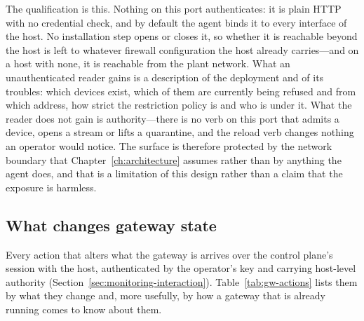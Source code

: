 \documentclass[12pt,a4paper]{report}
\begin{document}
The qualification is this. Nothing on this port authenticates: it is
plain HTTP with no credential check, and by default the agent binds it
to every interface of the host. No installation step opens or closes
it, so whether it is reachable beyond the host is left to whatever
firewall configuration the host already carries---and on a host with
none, it is reachable from the plant network. What an unauthenticated
reader gains is a description of the deployment and of its troubles:
which devices exist, which of them are currently being refused and from
which address, how strict the restriction policy is and who is under
it. What the reader does not gain is authority---there is no verb on
this port that admits a device, opens a stream or lifts a quarantine,
and the reload verb changes nothing an operator would notice. The
surface is therefore protected by the network boundary that
Chapter~\ref{ch:architecture} assumes rather than by anything the agent
does, and that is a limitation of this design rather than a claim that
the exposure is harmless.

\subsection{What changes gateway state}
\label{sec:gw-api-write}

Every action that alters what the gateway is arrives over the control
plane's session with the host, authenticated by the operator's key and
carrying host-level authority
(Section~\ref{sec:monitoring-interaction}). Table~\ref{tab:gw-actions}
lists them by what they change and, more usefully, by how a gateway
that is already running comes to know about them.
\end{document}
